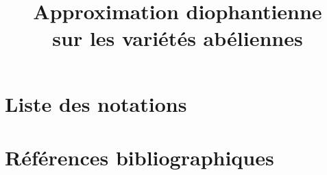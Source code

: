 \documentclass[nomencl]{mpg-preth}
\title{Approximation diophantienne \\ sur les variétés abéliennes}
\begin{document}
\maketitle
{}






\appendix



\chapter{Liste des notations}
\printnomenclature

\chapter{Références bibliographiques}
\printbibliography[heading=bibempty]
\end{document}
